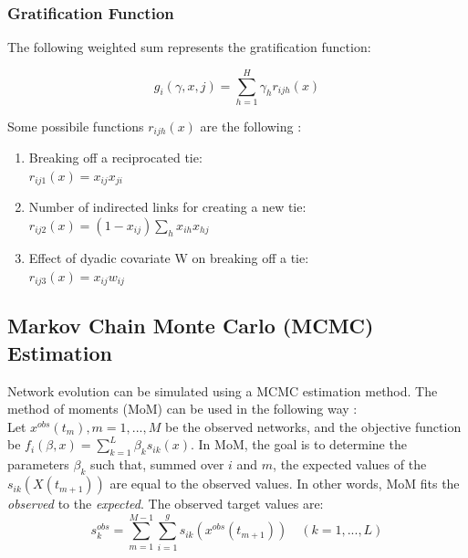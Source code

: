 \documentclass[11pt]{report}
\begin{document}
\subsubsection{Gratification Function}
The following weighted sum represents the gratification function:

\begin{equation}
g_i(\gamma, x, j) = \sum_{h = 1}^{H} \gamma_h r_{ijh}(x)
\end{equation}

Some possibile functions $r_{ijh}(x)$ are the following \cite{Snijders2004}:
\begin{enumerate}
\item Breaking off a reciprocated tie:\\ 
$r_{ij1}(x) = x_{ij} x_{ji}$
\item Number of indirected links for creating a new tie:\\ $r_{ij2}(x) = (1 - x_{ij}) \sum_h x_{ih} x_{hj}$
\item Effect of dyadic covariate W on breaking off a tie:\\
$r_{ij3}(x) = x_{ij}w_{ij}$
\end{enumerate}

\subsection{Markov Chain Monte Carlo (MCMC) Estimation}
Network evolution can be simulated using a MCMC estimation method. The method of moments (MoM) can be used in the following way \cite{Snijders2004}: \\

Let $x^{obs}(t_m), m = 1, ..., M$ be the observed networks, and the objective function be $f_i(\beta, x) = \sum_{k=1}^L \beta_k s_{ik}(x)$. 
In MoM, the goal is to determine the parameters $\beta_k$ such that, summed over $i$ and $m$, the expected values of the $s_{ik}(X(t_{m+1}))$ are equal to the observed values. In other words, MoM fits the \textit{observed} to the \textit{expected}. 
The observed target values are:
\begin{equation}
s_k^{obs} = \sum_{m=1}^{M-1}\sum_{i=1}^g s_{ik}(x^{obs}(t_{m+1})) \quad (k = 1, ..., L)
\end{equation}
\end{document}
